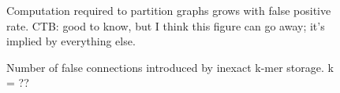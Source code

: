 \documentclass[12pt]{article} \usepackage{simplemargins}
\begin{document}
\begin{figure}
\caption{Computation required to partition graphs grows with false positive
rate.  CTB: good to know, but I think this figure can go away; it's implied
by everything else.}
\end{figure}

\begin{figure}
\caption{Number of false connections introduced by inexact k-mer storage.
k = ??}
\end{figure}
\end{document}
